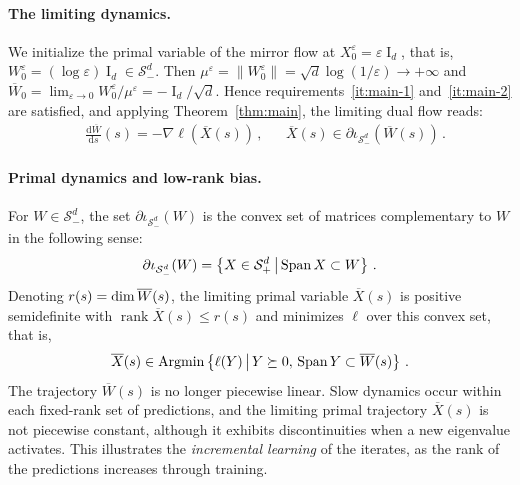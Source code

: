 \documentclass[11pt,english,reqno]{article}
\DeclareMathOperator{\Span}{Span}
\let\ker\relax
\DeclareMathOperator{\ker}{Ker}
\DeclareMathOperator{\rank}{rank}
\DeclareMathOperator{\I}{I}
\DeclareMathOperator{\Argmin}{Argmin}
\newcommand{\diff}{\mathrm{d}}
\renewcommand{\leq}{\leqslant}
\theoremstyle{plain}
\theoremstyle{definition}
\theoremstyle{remark}
\numberwithin{equation}{section}
\begin{document}
\paragraph{The limiting dynamics.} We initialize the primal variable of the mirror flow at $X^\varepsilon_0 = \varepsilon \I_d$, that is, $W^\varepsilon_0 = (\log \varepsilon)\I_d \in \mathcal{S}^d_-$. Then $\mu^\varepsilon = \|W^\varepsilon_0\| = \sqrt{d}\log(1/\varepsilon) \to +\infty$ and $\overline{W}_0 = \lim_{\varepsilon \to 0} W^\varepsilon_0 / \mu^\varepsilon = -\I_d/\sqrt{d}$. Hence requirements~\ref{it:main-1} and~\ref{it:main-2} are satisfied, and applying Theorem~\ref{thm:main}, the limiting dual flow reads:
%
\begin{align*}
	&\frac{\diff \overline{W}}{\diff s} (s) = - \nabla \ell(\overline{X}(s)) \, , &&\overline{X}(s) \in \partial \iota_{\mathcal{S}^{d}_-}(\overline{W}(s)) \, .
\end{align*}
 
\paragraph{Primal dynamics and low-rank bias.} For $W \in \mathcal{S}^d_-$, the set $\partial \iota_{\mathcal{S}^{d}_-}(W)$ is the convex set of matrices complementary to $W$ in the following sense:
%
\begin{equation*}
	\partial \iota_{\mathcal{S}^{d}_-}(W) = \left\{ X \in \mathcal{S}^d_+ \,\middle|\, \Span X \subset \ker W \right\} \, .
\end{equation*}
%
Denoting $r(s) = \dim \ker \overline{W}(s)$, the limiting primal variable $\overline{X}(s)$ is positive semidefinite with $\rank \overline{X}(s) \leq r(s)$ and minimizes $\ell$ over this convex set, that is,
%
\begin{equation*}
	\overline{X}(s) \in \Argmin \left\{ \ell(Y) \,\middle|\, Y \succeq 0 , \, \Span Y \subset \ker \overline{W}(s)\right\} \, .
\end{equation*}
%
The trajectory $\overline{W}(s)$ is no longer piecewise linear. Slow dynamics occur within each fixed-rank set of predictions, and the limiting primal trajectory $\overline{X}(s)$ is not piecewise constant, although it exhibits discontinuities when a new eigenvalue activates. This illustrates the \textit{incremental learning} of the iterates, as the rank of the predictions increases through training.
\end{document}
